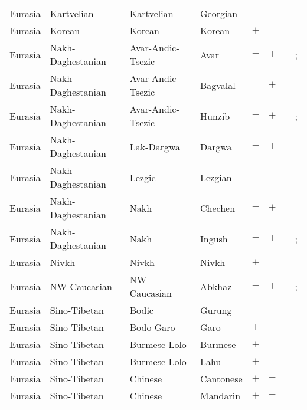 \begin{landscape}
\begin{longtable}{l>{\raggedright\arraybackslash}p{2.2cm}>{\raggedright}p{2.5cm}>{\raggedright\arraybackslash}p{2.5cm}cc>{\raggedright\arraybackslash}p{3.4cm}>{\raggedright\arraybackslash}p{3.4cm}}
Eurasia & Kartvelian & Kartvelian & Georgian & $-$ & $-$ & \citealt{Gil2013} & \citealt{Corbett2013}\\
Eurasia & Korean & Korean & Korean & $+$ & $-$ & \citealt{Gil2013} & \citealt[297]{Nichols1992}\\
Eurasia & Nakh-Daghestanian & Avar-Andic-Tsezic & Avar & $-$ & $+$ & \citealt{Gil2013} & \citealt[29--30]{Charachidze1981}; \citealt[155--156]{Berg2005}\\
Eurasia & Nakh-Daghestanian & Avar-Andic-Tsezic & Bagvalal & $-$ & $+$ & \citealt{Gil2013} & \citealt[749--750]{Corbett2006}\\
Eurasia & Nakh-Daghestanian & Avar-Andic-Tsezic & Hunzib & $-$ & $+$ & \citealt{Gil2013} & \citealt{Corbett2013}; \citealt[1367]{Berg2004}\\
Eurasia & Nakh-Daghestanian & Lak-Dargwa & Dargwa & $-$ & $+$ & \citealt{Gil2013} & \citealt[156--158]{Berg2005}\\
Eurasia & Nakh-Daghestanian & Lezgic & Lezgian & $-$ & $-$ & \citealt{Gil2013} & \citealt{Corbett2013}\\
Eurasia & Nakh-Daghestanian & Nakh & Chechen & $-$ & $+$ & \citealt{Gil2013} & \citealt[37]{Nichols1994}\\
Eurasia & Nakh-Daghestanian & Nakh & Ingush & $-$ & $+$ & \citealt{Gil2013} & \citealt{Corbett2013}; \citealt[141--142]{Nichols2011}\\
Eurasia & Nivkh & Nivkh & Nivkh & $+$ & $-$ & \citealt{Gil2013} & \citealt{Corbett2013}\\
Eurasia & NW Caucasian & NW Caucasian & Abkhaz & $-$ & $+$ & \citealt{Gil2013} & \citealt{Corbett2013}; \citealt[108]{Spruit1986}\\
Eurasia & Sino-Tibetan & Bodic & Gurung & $-$ & $-$ & \citealt[297]{Nichols1992}& \citealt[297]{Nichols1992}\\
Eurasia & Sino-Tibetan & Bodo-Garo & Garo & $+$ & $-$ & \citealt{Gil2013} & \citealt[passim]{Burling1961}\\
Eurasia & Sino-Tibetan & Burmese-Lolo & Burmese & $+$ & $-$ & \citealt{Gil2013} & \citealt{Corbett2013}\\
Eurasia & Sino-Tibetan & Burmese-Lolo & Lahu & $+$ & $-$ & \citealt{Gil2013} & \citealt{Corbett2013}\\
Eurasia & Sino-Tibetan & Chinese & Cantonese & $+$ & $-$ & \citealt{Gil2013} & \citealt{Corbett2013}\\
Eurasia & Sino-Tibetan & Chinese & Mandarin & $+$ & $-$ & \citealt{Gil2013} & \citealt{Corbett2013}\\

\end{longtable}
\end{landscape}
